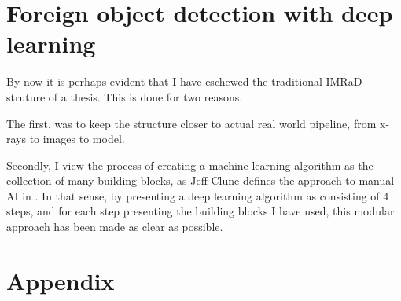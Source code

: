 \documentclass[a4paper,11pt,openany]{jespersthesis}
\begin{document}
\part{Foreign object detection with deep learning}
{\vspace*{-2cm}
By now it is perhaps evident that I have eschewed the traditional IMRaD struture of a thesis.
This is done for two reasons.

The first, was to keep the structure closer to actual real world pipeline, from x-rays to images to model.

Secondly, I view the process of creating a machine learning algorithm as the collection of many building blocks, as Jeff Clune defines the approach to manual AI in \cite{cluneAIGAsAIgeneratingAlgorithms2020}. In that sense, by presenting a deep learning algorithm as consisting of 4 steps, and for each step presenting the building blocks I have used, this modular approach has been made as clear as possible.
}

%


%


%
%

\appendix
{}
\part*{Appendix}




\cleardoublepage
\pagestyle{empty}


\end{document}
